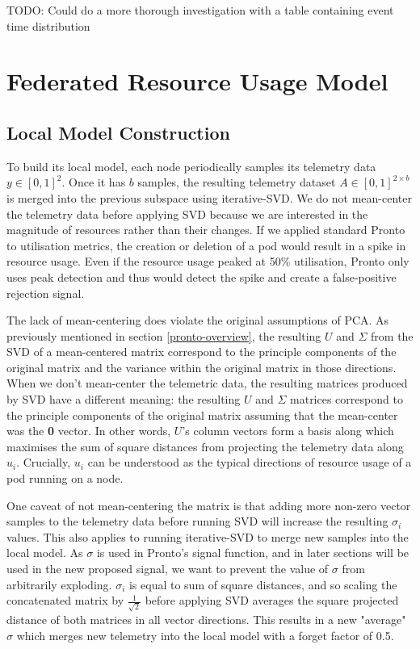 TODO: Could do a more thorough investigation with a table containing event
time distribution

\section{Federated Resource Usage Model}

\subsection{Local Model Construction}
\label{sec:local-model-construction}

To build its local model, each node periodically samples its telemetry data $y
\in [0,1]^{2}$. Once it has $b$ samples, the resulting telemetry dataset $A \in
[0,1]^{2 \times b}$ is merged into the previous subspace using iterative-SVD. We
do not mean-center the telemetry data before applying SVD because we are
interested in the magnitude of resources rather than their changes. If we
applied standard Pronto to utilisation metrics, the creation or deletion of a
pod would result in a spike in resource usage. Even if the resource usage peaked
at 50\% utilisation, Pronto only uses peak detection and thus would detect the
spike and create a false-positive rejection signal.

The lack of mean-centering does violate the original assumptions of PCA. As
previously mentioned in section \ref{pronto-overview}, the resulting $U$ and
$\Sigma$ from the SVD of a mean-centered matrix correspond to the principle
components of the original matrix and the variance within the original matrix in
those directions. When we don't mean-center the telemetric data, the resulting
matrices produced by SVD have a different meaning: the resulting $U$ and
$\Sigma$ matrices correspond to the principle components of the original matrix
assuming that the mean-center was the \textbf{0} vector. In other words, $U$'s
column vectors form a basis along which maximises the sum of square distances
from projecting the telemetry data along $u_i$. Crucially, $u_i$ can be
understood as the typical directions of resource usage of a pod running on a
node.

One caveat of not mean-centering the matrix is that adding more non-zero
vector samples to the telemetry data before running SVD will increase the
resulting $\sigma_i$ values. This also applies to running iterative-SVD to merge
new samples into the local model. As $\sigma$ is used in Pronto's signal
function, and in later sections will be used in the new proposed signal, we want
to prevent the value of $\sigma$ from arbitrarily exploding. $\sigma_i$ is equal to sum of square
distances, and so scaling the concatenated matrix by $\frac{1}{\sqrt{2}}$ before
applying SVD averages the square projected distance of both matrices in all
vector directions. This results in a new "average" $\sigma$ which merges new
telemetry into the local model with a forget factor of 0.5.

